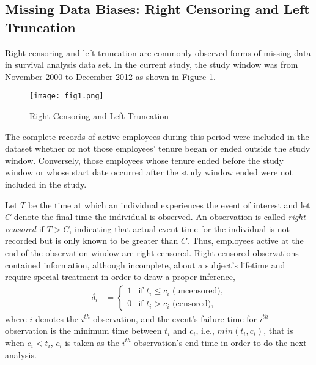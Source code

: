 \subsection{Missing Data Biases: Right Censoring and Left Truncation}\label{bias}
Right censoring and left truncation are commonly observed forms of missing data in survival analysis data set. In the current study, the study window was from November 2000 to December 2012 as shown in Figure \ref{fig:1}.
\begin{figure}[htbp]
	\centering
	\texttt{[image: fig1.png]}
	\caption{Right Censoring and Left Truncation}
	\label{fig:1}
\end{figure}
The complete records of active employees during this period were included in the dataset whether or not those employees' tenure began or ended outside the study window. Conversely, those employees whose tenure ended before the study window or whose start date occurred after the study window ended were not included in the study.

Let $T$ be the time at which  an individual experiences the event of interest and let $C$ denote the final time the individual is observed. An observation is called {\it right censored} if $T> C$, indicating that actual event time for the individual is not recorded but is only known to be greater than $C$. Thus, employees active at the end of the observation window are right censored. Right censored observations contained information, although incomplete, about a subject's lifetime and require special treatment in order to draw a proper inference,
\begin{align*}
\delta_i&=
\begin{cases}
1   &\text{if  }  t_i \leq c_i \text{ (uncensored),}\\
0   &\text{if  }  t_i > c_i \text{ (censored),}
\end{cases}
\end{align*}
where $i$ denotes the $i^{th}$ observation, and the event's failure time for $i^{th}$ observation is the minimum time between $t_i$ and $c_i$, i.e., $min(t_i, c_i)$, that is when $c_i <t_i $, $c_i$ is taken as the $i^{th}$ observation's end time in order to do the next analysis.

